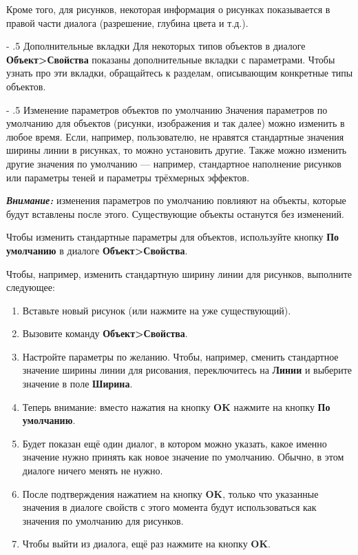 \documentclass[a4paper,10pt]{article}
\makeatletter
\renewcommand\paragraph{%
   \@startsection{paragraph}{4}{0mm}%
      {-\baselineskip}%
      {.5\baselineskip}%
      {\normalfont\normalsize\bfseries}}
\makeatother
\begin{document}
Кроме того, для рисунков, некоторая информация о рисунках показывается в правой части диалога (разрешение, глубина цвета и т.д.).

\paragraph{Дополнительные вкладки}
Для некоторых типов объектов в диалоге \textbf{Объект>Свойства} показаны дополнительные вкладки с параметрами. Чтобы узнать про эти вкладки, обращайтесь к разделам, описывающим конкретные типы объектов.

\paragraph{Изменение параметров объектов по умолчанию}
Значения параметров по умолчанию для объектов (рисунки, изображения и так далее) можно изменить в любое время. Если, например, пользователю, не нравятся стандартные значения ширины линии в рисунках, то можно установить другие. Также можно изменить другие значения по умолчанию --- например, стандартное наполнение рисунков или параметры теней и параметры трёхмерных эффектов.

\begin{mdframed}[backgroundcolor=blue!10]
\textbf{\textit{Внимание:}} изменения параметров по умолчанию повлияют на объекты, которые будут вставлены после этого. Существующие объекты останутся без изменений.
\end{mdframed}

Чтобы изменить стандартные параметры для объектов, используйте кнопку \textbf{По умолчанию} в диалоге \textbf{Объект>Свойства}.

Чтобы, например, изменить стандартную ширину линии для рисунков, выполните следующее:

\begin{enumerate}
 \item Вставьте новый рисунок (или нажмите на уже существующий).
 \item Вызовите команду \textbf{Объект>Свойства}.
 \item Настройте параметры по желанию. Чтобы, например, сменить стандартное значение ширины линии для рисования, переключитесь на \textbf{Линии} и выберите значение в поле \textbf{Ширина}.
 \item Теперь внимание: вместо нажатия на кнопку \textbf{OK} нажмите на кнопку \textbf{По умолчанию}.
 \item Будет показан ещё один диалог, в котором можно указать, какое именно значение нужно принять как новое значение по умолчанию. Обычно, в этом диалоге ничего менять не нужно.
 \item После подтверждения нажатием на кнопку \textbf{OK}, только что указанные значения в диалоге свойств с этого момента будут использоваться как значения по умолчанию для рисунков.
 \item Чтобы выйти из диалога, ещё раз нажмите на кнопку \textbf{OK}.
\end{enumerate}
\end{document}
